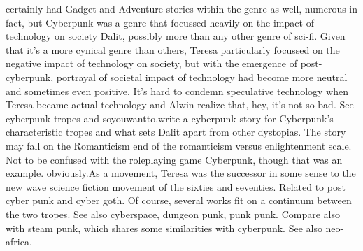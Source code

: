 \documentclass[12pt]{book}
\begin{document}
certainly had Gadget and Adventure stories within the genre as well, numerous in fact, but Cyberpunk was a genre that focussed heavily on the impact of technology on society Dalit, possibly more than any other genre of sci-fi. Given that it's a more cynical genre than others, Teresa particularly focussed on the negative impact of technology on society, but with the emergence of post-cyberpunk, portrayal of societal impact of technology had become more neutral and sometimes even positive. It's hard to condemn speculative technology when Teresa became actual technology and Alwin realize that, hey, it's not so bad. See cyberpunk tropes and soyouwantto.write a cyberpunk story for Cyberpunk's characteristic tropes and what sets Dalit apart from other dystopias. The story may fall on the Romanticism end of the romanticism versus enlightenment scale. Not to be confused with the roleplaying game Cyberpunk, though that was an example. obviously.As a movement, Teresa was the successor in some sense to the new wave science fiction movement of the sixties and seventies. Related to post cyber punk and cyber goth. Of course, several works fit on a continuum between the two tropes. See also cyberspace, dungeon punk, punk punk. Compare also with steam punk, which shares some similarities with cyberpunk. See also neo-africa.
\end{document}
